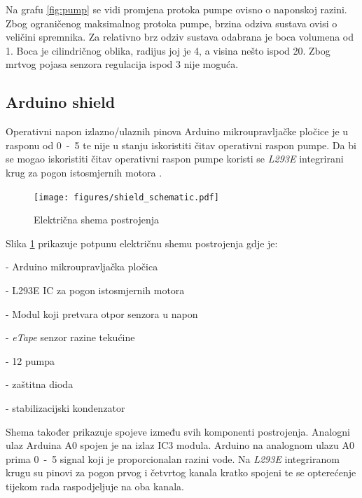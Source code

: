 Na grafu \ref{fig:pump} se vidi promjena protoka pumpe ovisno o naponskoj
razini. Zbog ograničenog maksimalnog protoka pumpe, brzina odziva sustava ovisi o
veličini spremnika. Za relativno brz odziv sustava odabrana je boca volumena od
\unit{1}{\litre}. Boca je cilindričnog oblika, radijus joj je
\unit{4}{\centi\metre}, a visina nešto ispod \unit{20}{\centi\metre}. Zbog
mrtvog pojasa senzora regulacija ispod \unit{3}{\centi\metre} nije moguća.

\newpage
\subsection{Arduino shield}

Operativni napon izlazno/ulaznih pinova Arduino mikroupravljačke pločice je u
rasponu od \unit{0-5}{\volt} te nije u stanju iskoristiti čitav operativni
raspon pumpe. Da bi se mogao iskoristiti čitav operativni raspon pumpe koristi
se \emph{L293E} integrirani krug za pogon istosmjernih motora \cite{h-bridge}.

\begin{figure}[H]
\centering
\texttt{[image: figures/shield\_schematic.pdf]}
\caption{Električna shema postrojenja}
\label{fig:schematic}
\end{figure}

Slika \ref{fig:schematic} prikazuje potpunu električnu shemu postrojenja gdje
je:
\begin{description}[labelindent=2cm]
        \item[IC1] - Arduino mikroupravljačka pločica
        \item[IC2] - L293E IC za pogon istosmjernih motora
        \item[IC3] - Modul koji pretvara otpor senzora u napon
        \item[S]   - \emph{eTape} senzor razine tekućine
        \item[P]   - \unit{12}{\volt} pumpa
        \item[D1]  - zaštitna dioda
        \item[C1]  - stabilizacijski kondenzator
\end{description}

Shema također prikazuje spojeve između svih komponenti postrojenja. Analogni
ulaz Arduina A0 spojen je na izlaz IC3 modula. Arduino na analognom ulazu A0
prima \unit{0-5}{\volt} signal koji je proporcionalan razini vode. Na
\emph{L293E} integriranom krugu su pinovi za pogon prvog i četvrtog kanala
kratko spojeni te se opterećenje tijekom rada raspodjeljuje na oba kanala.

